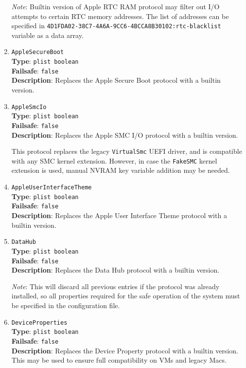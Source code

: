 \documentclass[]{article}
\begin{document}
\begin{enumerate}
  \emph{Note}: Builtin version of Apple RTC RAM protocol may filter out
  I/O attempts to certain RTC memory addresses. The list of addresses
  can be specified in \texttt{4D1FDA02-38C7-4A6A-9CC6-4BCCA8B30102:rtc-blacklist}
  variable as a data array.

\item
  \texttt{AppleSecureBoot}\\
  \textbf{Type}: \texttt{plist\ boolean}\\
  \textbf{Failsafe}: \texttt{false}\\
  \textbf{Description}: Replaces the Apple Secure Boot protocol with a builtin
  version.

\item
  \texttt{AppleSmcIo}\\
  \textbf{Type}: \texttt{plist\ boolean}\\
  \textbf{Failsafe}: \texttt{false}\\
  \textbf{Description}: Replaces the Apple SMC I/O protocol with a builtin
  version.

  This protocol replaces the legacy \texttt{VirtualSmc} UEFI driver, and is compatible
  with any SMC kernel extension. However, in case the \texttt{FakeSMC} kernel extension
  is used, manual NVRAM key variable addition may be needed.

\item
  \texttt{AppleUserInterfaceTheme}\\
  \textbf{Type}: \texttt{plist\ boolean}\\
  \textbf{Failsafe}: \texttt{false}\\
  \textbf{Description}: Replaces the Apple User Interface Theme protocol with a builtin
  version.

\item
  \texttt{DataHub}\\
  \textbf{Type}: \texttt{plist\ boolean}\\
  \textbf{Failsafe}: \texttt{false}\\
  \textbf{Description}: Replaces the Data Hub protocol with a builtin version.

  \emph{Note}: This will discard all previous entries if the protocol was already
  installed, so all properties required for the safe operation of the system must
  be specified in the configuration file.

\item
  \texttt{DeviceProperties}\\
  \textbf{Type}: \texttt{plist\ boolean}\\
  \textbf{Failsafe}: \texttt{false}\\
  \textbf{Description}: Replaces the Device Property protocol with a builtin
  version. This may be used to ensure full compatibility on VMs and legacy Macs.


\end{enumerate}
\end{document}
